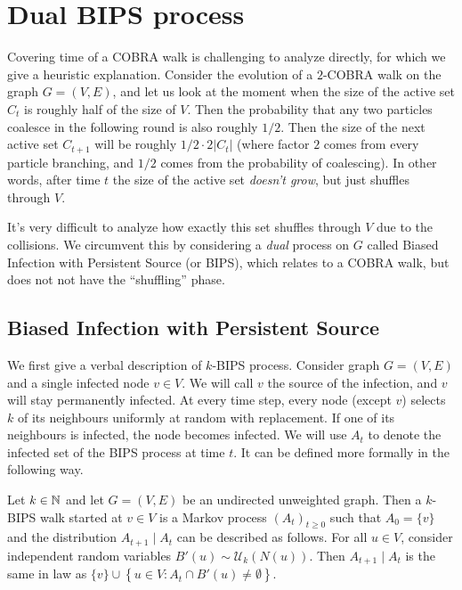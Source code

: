 \documentclass[11pt]{article}
\theoremstyle{remark}
\begin{document}


\section{Dual BIPS process}

Covering time of a COBRA walk is challenging to analyze directly, for which we give a heuristic explanation. Consider the evolution of a $2$-COBRA walk on the graph $G = (V,E)$, and let us look at the moment when the size of the active set $C_t$ is roughly half of the size of $V$. Then the probability that any two particles coalesce in the following round is also roughly $1/2$. Then the size of the next active set $C_{t+1}$ will be roughly $1/2\cdot 2|C_t|$ (where factor $2$ comes from every particle branching, and $1/2$ comes from the probability of coalescing). In other words, after time $t$ the size of the active set \emph{doesn't grow}, but just shuffles through $V$. 

It's very difficult to analyze how exactly this set shuffles through $V$ due to the collisions. We circumvent this by considering a \emph{dual} process on $G$ called Biased Infection with Persistent Source (or BIPS), which relates to a COBRA walk, but does not not have the ``shuffling'' phase. 

\subsection{Biased Infection with Persistent Source}

We first give a verbal description of $k$-BIPS process. Consider graph $G = (V,E)$ and a single infected node $v \in V$. We will call $v$ the source of the infection, and $v$ will stay permanently infected. At every time step, every node (except $v$) selects $k$ of its neighbours uniformly at random with replacement. If one of its neighbours is infected, the node becomes infected. We will use $A_t$ to denote the infected set of the BIPS process at time $t$. It can be defined more formally in the following way.

\begin{definition}
\label{def:bips}
    Let $k\in \mathbb N$ and let $G = (V,E)$ be an undirected unweighted graph. 
    Then a $k$-BIPS walk started at $v \in V$ is a Markov process $(A_t)_{t\ge0}$ such that $A_0 = \{v\}$ and the distribution $A_{t+1} \mid A_t$ can be described as follows. For all $u \in V$, consider independent random variables $B'(u) \sim \mathcal U_k(N(u))$. Then $A_{t+1} \mid A_t$ is the same in law as $\{v\} \cup \left\{u \in V: A_t \cap B'(u)\not = \emptyset \right\}$.
 \end{definition}
\end{document}
